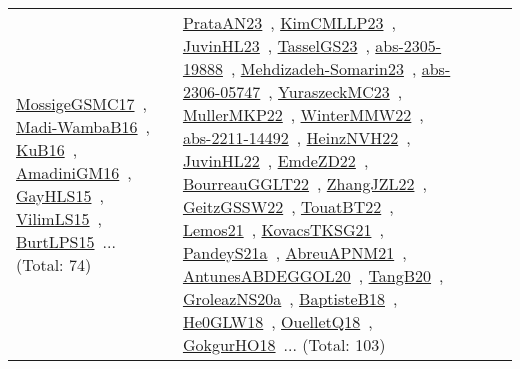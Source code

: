{\begin{longtable}{lp{3cm}>{\raggedright\arraybackslash}p{6cm}>{\raggedright\arraybackslash}p{6cm}>{\raggedright\arraybackslash}p{8cm}}
\href{works/MossigeGSMC17.pdf}{MossigeGSMC17}~\cite{MossigeGSMC17}, \href{works/Madi-WambaB16.pdf}{Madi-WambaB16}~\cite{Madi-WambaB16}, \href{works/KuB16.pdf}{KuB16}~\cite{KuB16}, \href{works/AmadiniGM16.pdf}{AmadiniGM16}~\cite{AmadiniGM16}, \href{works/GayHLS15.pdf}{GayHLS15}~\cite{GayHLS15}, \href{works/VilimLS15.pdf}{VilimLS15}~\cite{VilimLS15}, \href{works/BurtLPS15.pdf}{BurtLPS15}~\cite{BurtLPS15}... (Total: 74) & \href{works/PrataAN23.pdf}{PrataAN23}~\cite{PrataAN23}, \href{works/KimCMLLP23.pdf}{KimCMLLP23}~\cite{KimCMLLP23}, \href{works/JuvinHL23.pdf}{JuvinHL23}~\cite{JuvinHL23}, \href{works/TasselGS23.pdf}{TasselGS23}~\cite{TasselGS23}, \href{works/abs-2305-19888.pdf}{abs-2305-19888}~\cite{abs-2305-19888}, \href{works/Mehdizadeh-Somarin23.pdf}{Mehdizadeh-Somarin23}~\cite{Mehdizadeh-Somarin23}, \href{works/abs-2306-05747.pdf}{abs-2306-05747}~\cite{abs-2306-05747}, \href{works/YuraszeckMC23.pdf}{YuraszeckMC23}~\cite{YuraszeckMC23}, \href{works/MullerMKP22.pdf}{MullerMKP22}~\cite{MullerMKP22}, \href{works/WinterMMW22.pdf}{WinterMMW22}~\cite{WinterMMW22}, \href{works/abs-2211-14492.pdf}{abs-2211-14492}~\cite{abs-2211-14492}, \href{works/HeinzNVH22.pdf}{HeinzNVH22}~\cite{HeinzNVH22}, \href{works/JuvinHL22.pdf}{JuvinHL22}~\cite{JuvinHL22}, \href{works/EmdeZD22.pdf}{EmdeZD22}~\cite{EmdeZD22}, \href{works/BourreauGGLT22.pdf}{BourreauGGLT22}~\cite{BourreauGGLT22}, \href{works/ZhangJZL22.pdf}{ZhangJZL22}~\cite{ZhangJZL22}, \href{works/GeitzGSSW22.pdf}{GeitzGSSW22}~\cite{GeitzGSSW22}, \href{works/TouatBT22.pdf}{TouatBT22}~\cite{TouatBT22}, \href{works/Lemos21.pdf}{Lemos21}~\cite{Lemos21}, \href{works/KovacsTKSG21.pdf}{KovacsTKSG21}~\cite{KovacsTKSG21}, \href{works/PandeyS21a.pdf}{PandeyS21a}~\cite{PandeyS21a}, \href{works/AbreuAPNM21.pdf}{AbreuAPNM21}~\cite{AbreuAPNM21}, \href{works/AntunesABDEGGOL20.pdf}{AntunesABDEGGOL20}~\cite{AntunesABDEGGOL20}, \href{works/TangB20.pdf}{TangB20}~\cite{TangB20}, \href{works/GroleazNS20a.pdf}{GroleazNS20a}~\cite{GroleazNS20a}, \href{works/BaptisteB18.pdf}{BaptisteB18}~\cite{BaptisteB18}, \href{works/He0GLW18.pdf}{He0GLW18}~\cite{He0GLW18}, \href{works/OuelletQ18.pdf}{OuelletQ18}~\cite{OuelletQ18}, \href{works/GokgurHO18.pdf}{GokgurHO18}~\cite{GokgurHO18}... (Total: 103)\\

\end{longtable}}
